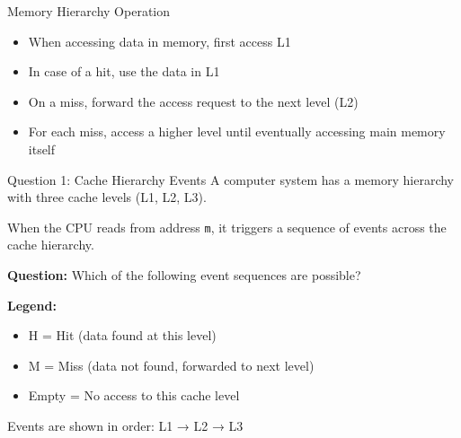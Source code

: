 \documentclass[aspectratio=169,12pt]{beamer}
\begin{document}
\begin{frame}{Memory Hierarchy Operation}
\begin{itemize}
    \item When accessing data in memory, first access L1
    \item In case of a hit, use the data in L1
    \item On a miss, forward the access request to the next level (L2)
    \item For each miss, access a higher level until eventually accessing main memory itself
\end{itemize}
\vspace{0.5cm}
\begin{center}
\end{center}
\end{frame}

\begin{frame}{Question 1: Cache Hierarchy Events}
A computer system has a memory hierarchy with three cache levels (L1, L2, L3).

When the CPU reads from address \texttt{m}, it triggers a sequence of events across the cache hierarchy.

\textbf{Question:} Which of the following event sequences are possible?

\vspace{0.3cm}
\small
\textbf{Legend:}
\begin{itemize}
    \item H = Hit (data found at this level)
    \item M = Miss (data not found, forwarded to next level)
    \item Empty = No access to this cache level
\end{itemize}

Events are shown in order: L1 → L2 → L3
\end{frame}
\end{document}
